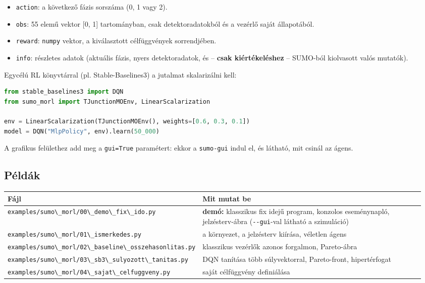 \begin{itemize}
\tightlist
\item
  \passthrough{\lstinline!action!}: a
  következő fázis sorszáma (0, 1 vagy
  2).
\item
  \passthrough{\lstinline!obs!}: 55
  elemű vektor {[}0, 1{]} tartományban,
  csak detektoradatokból és a vezérlő
  saját állapotából.
\item
  \passthrough{\lstinline!reward!}:
  \passthrough{\lstinline!numpy!}
  vektor, a kiválasztott célfüggvények
  sorrendjében.
\item
  \passthrough{\lstinline!info!}:
  részletes adatok (aktuális fázis,
  nyers detektoradatok, és --
  \textbf{csak kiértékeléshez} --
  SUMO-ból kiolvasott valós mutatók).
\end{itemize}

Egycélú RL könyvtárral (pl.
Stable-Baselines3) a jutalmat
skalarizálni kell:

\begin{lstlisting}[language=Python]
from stable_baselines3 import DQN
from sumo_morl import TJunctionMOEnv, LinearScalarization

env = LinearScalarization(TJunctionMOEnv(), weights=[0.6, 0.3, 0.1])
model = DQN("MlpPolicy", env).learn(50_000)
\end{lstlisting}

A grafikus felülethez add meg a
\passthrough{\lstinline!gui=True!}
paramétert: ekkor a
\passthrough{\lstinline!sumo-gui!} indul
el, és látható, mit csinál az ágens.

\hypertarget{puxe9lduxe1k}{%
\subsection{Példák}\label{puxe9lduxe1k}}

\begin{longtable}[]{@{}>{\raggedright\arraybackslash}p{0.32\linewidth}>{\raggedright\arraybackslash}p{0.64\linewidth}@{}}
\toprule\noalign{}
Fájl & Mit mutat be \\
\midrule\noalign{}
\endhead
\bottomrule\noalign{}
\endlastfoot
\passthrough{\lstinline!examples/sumo\_morl/00\_demo\_fix\_ido.py!}
& \textbf{demó:} klasszikus fix idejű
program, konzolos eseménynapló,
jelzésterv-ábra
(\passthrough{\lstinline!--gui!}-val
látható a szimuláció) \\
\passthrough{\lstinline!examples/sumo\_morl/01\_ismerkedes.py!}
& a környezet, a jelzésterv kiírása,
véletlen ágens \\
\passthrough{\lstinline!examples/sumo\_morl/02\_baseline\_osszehasonlitas.py!}
& klasszikus vezérlők azonos forgalmon,
Pareto-ábra \\
\passthrough{\lstinline!examples/sumo\_morl/03\_sb3\_sulyozott\_tanitas.py!}
& DQN tanítása több súlyvektorral,
Pareto-front, hipertérfogat \\
\passthrough{\lstinline!examples/sumo\_morl/04\_sajat\_celfuggveny.py!}
& saját célfüggvény definiálása \\
\end{longtable}

